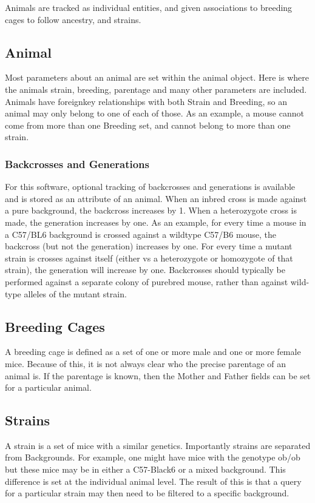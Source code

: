 \documentclass[letterpaper,10pt,english]{sphinxmanual}
\begin{document}
Animals are tracked as individual entities, and given associations to breeding cages to follow ancestry, and strains.


\subsection{Animal}
\label{api:animal}
Most parameters about an animal are set within the animal object.  Here is where the animals strain, breeding, parentage and many other parameters are included.  Animals have foreignkey relationships with both Strain and Breeding, so an animal may only belong to one of each of those.  As an example, a mouse cannot come from more than one Breeding set, and cannot belong to more than one strain.


\subsubsection{Backcrosses and Generations}
\label{api:backcrosses-and-generations}
For this software, optional tracking of backcrosses and generations is available and is stored as an attribute of an animal.  When an inbred cross is made against a pure background, the backcross increases by 1.  When a heterozygote cross is made, the generation increases by one.  As an example, for every time a mouse in a C57/BL6 background is crossed against a wildtype C57/B6 mouse, the backcross (but not the generation) increases by one.  For every time a mutant strain is crosses against itself (either vs a heterozygote or homozygote of that strain), the generation will increase by one.  Backcrosses should typically be performed against a separate colony of purebred mouse, rather than against wild-type alleles of the mutant strain.


\subsection{Breeding Cages}
\label{api:breeding-cages}
A breeding cage is defined as a set of one or more male and one or more female mice.  Because of this, it is not always clear who the precise parentage of an animal is.  If the parentage is known, then the Mother and Father fields can be set for a particular animal.


\subsection{Strains}
\label{api:strains}
A strain is a set of mice with a similar genetics.  Importantly strains are separated from Backgrounds.  For example, one might have mice with the genotype ob/ob but these mice may be in either a C57-Black6 or a mixed background.  This difference is set at the individual animal level.  
The result of this is that a query for a particular strain may then need to be filtered to a specific background.
\end{document}
